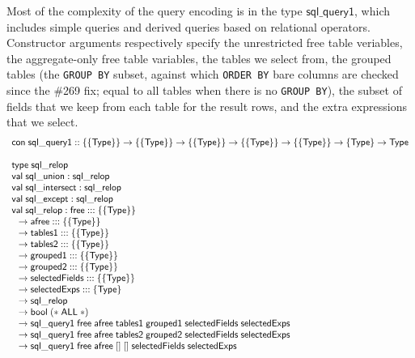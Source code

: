 \documentclass{article}
\newcommand{\mt}[1]{\mathsf{#1}}
\begin{document}
Most of the complexity of the query encoding is in the type $\mt{sql\_query1}$, which includes simple queries and derived queries based on relational operators.  Constructor arguments respectively specify the unrestricted free table veriables, the aggregate-only free table variables, the tables we select from, the grouped tables (the \texttt{GROUP BY} subset, against which \texttt{ORDER BY} bare columns are checked since the \#269 fix; equal to all tables when there is no \texttt{GROUP BY}), the subset of fields that we keep from each table for the result rows, and the extra expressions that we select.
$$\begin{array}{l}
  \mt{con} \; \mt{sql\_query1} :: \{\{\mt{Type}\}\} \to \{\{\mt{Type}\}\} \to \{\{\mt{Type}\}\} \to \{\{\mt{Type}\}\} \to \{\{\mt{Type}\}\} \to \{\mt{Type}\} \to \mt{Type} \\
  \\
  \mt{type} \; \mt{sql\_relop} \\
  \mt{val} \; \mt{sql\_union} : \mt{sql\_relop} \\
  \mt{val} \; \mt{sql\_intersect} : \mt{sql\_relop} \\
  \mt{val} \; \mt{sql\_except} : \mt{sql\_relop} \\
  \mt{val} \; \mt{sql\_relop} : \mt{free} ::: \{\{\mt{Type}\}\} \\
  \hspace{.1in} \to \mt{afree} ::: \{\{\mt{Type}\}\} \\
  \hspace{.1in} \to \mt{tables1} ::: \{\{\mt{Type}\}\} \\
  \hspace{.1in} \to \mt{tables2} ::: \{\{\mt{Type}\}\} \\
  \hspace{.1in} \to \mt{grouped1} ::: \{\{\mt{Type}\}\} \\
  \hspace{.1in} \to \mt{grouped2} ::: \{\{\mt{Type}\}\} \\
  \hspace{.1in} \to \mt{selectedFields} ::: \{\{\mt{Type}\}\} \\
  \hspace{.1in} \to \mt{selectedExps} ::: \{\mt{Type}\} \\
  \hspace{.1in} \to \mt{sql\_relop} \\
  \hspace{.1in} \to \mt{bool} \; (* \; \mt{ALL} \; *) \\
  \hspace{.1in} \to \mt{sql\_query1} \; \mt{free} \; \mt{afree} \; \mt{tables1} \; \mt{grouped1} \; \mt{selectedFields} \; \mt{selectedExps} \\
  \hspace{.1in} \to \mt{sql\_query1} \; \mt{free} \; \mt{afree} \; \mt{tables2} \; \mt{grouped2} \; \mt{selectedFields} \; \mt{selectedExps} \\
  \hspace{.1in} \to \mt{sql\_query1} \; \mt{free} \; \mt{afree} \; [] \; [] \; \mt{selectedFields} \; \mt{selectedExps}
\end{array}$$
\end{document}
